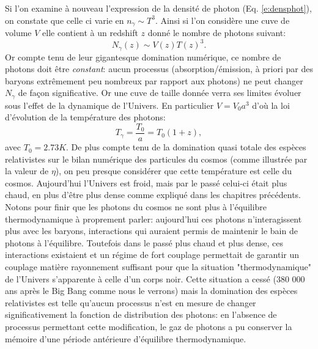 Si l'on examine à nouveau l'expression de la densité de photon (Eq. \ref{e:densphot}), on constate que celle ci varie en $n_\gamma \sim T^3$. Ainsi si l'on considère une cuve de volume $V$ elle contient à un redshift $z$ donné le nombre de photons suivant:
\begin{equation}
N_\gamma(z) \sim V(z) T(z)^3.
\end{equation}
Or compte tenu de leur gigantesque domination numérique, ce nombre de photons doit être \textit{constant}: aucun processus (absorption/émission, à priori par des baryons extrêmement peu nombreux par rapport aux photons) ne peut changer $N_\gamma$ de façon significative. Or une cuve de taille donnée verra ses limites évoluer sous l'effet de la dynamique de l'Univers. En particulier $V=V_0 a^3$ d'où la loi d'évolution de la température des photons:
\begin{equation}
T_\gamma=\frac{T_0}{a}=T_0 (1+z),
\end{equation}
avec $T_0=2.73K$. De plus compte tenu de la domination quasi totale des espèces relativistes sur le bilan numérique des particules du cosmos (comme illustrée par la valeur de $\eta$), on peu presque considérer que cette température est celle du cosmos. Aujourd'hui l'Univers est froid, mais par le passé celui-ci était plus chaud, en plus d'être plus dense comme expliqué dans les chapitres précédents. Notons pour finir que les photons du cosmos ne sont plus à l'équilibre thermodynamique à proprement parler: aujourd'hui ces photons n'interagissent plus avec les baryons, interactions qui auraient permis de maintenir le bain de photons à l'équilibre. Toutefois dans le passé plus chaud et plus dense, ces interactions existaient et un régime de fort couplage permettait de garantir un couplage matière rayonnement suffisant pour que la situation "thermodynamique" de l'Univers s'apparente à celle d'un corps noir. Cette situation a cessé (380 000 ans après le Big Bang comme nous le verrons) mais la domination des espèces relativistes est telle qu'aucun processus n'est en mesure de changer significativement la fonction de distribution des photons: en l'absence de processus permettant cette modification, le gaz de photons a pu conserver la mémoire d'une période antérieure d'équilibre thermodynamique.

